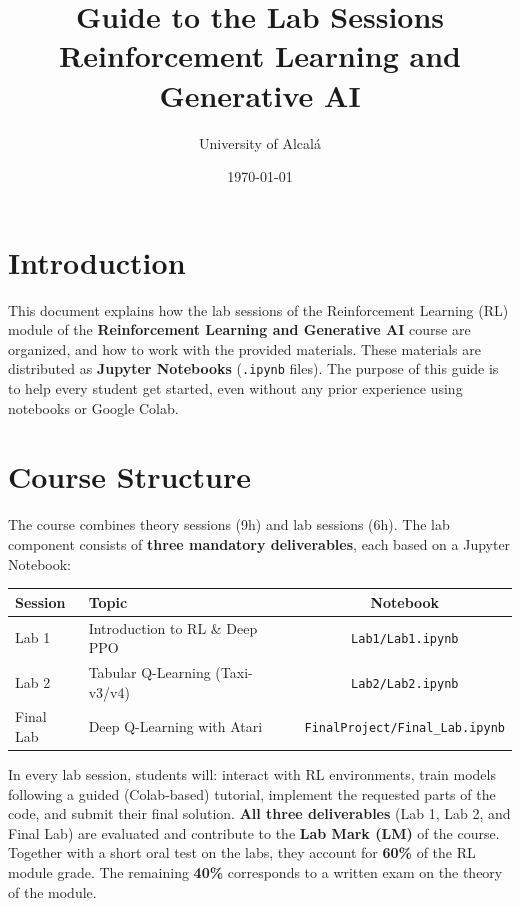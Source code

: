 \documentclass[11pt,a4paper]{article}
\title{\bfseries Guide to the Lab Sessions \\ \large Reinforcement Learning and Generative AI}
\author{University of Alcal\'a}
\date{\today}
\begin{document}
\maketitle
\thispagestyle{empty}

\tableofcontents
\newpage

\section{Introduction}
This document explains how the lab sessions of the Reinforcement Learning (RL) module of the \textbf{Reinforcement Learning and Generative AI} course are organized, and how to work with the provided materials. These materials are distributed as \textbf{Jupyter Notebooks} (\texttt{.ipynb} files). The purpose of this guide is to help every student get started, even without any prior experience using notebooks or Google Colab.

\section{Course Structure}

The course combines theory sessions (9h) and lab sessions (6h). The lab component consists of \textbf{three mandatory deliverables}, each based on a Jupyter Notebook:

\begin{table}[h!]
\centering
\begin{tabularx}{\textwidth}{l X c}
\toprule
\textbf{Session} & \textbf{Topic} & \textbf{Notebook} \\
\midrule
Lab 1 & Introduction to RL \& Deep PPO & \texttt{Lab1/Lab1.ipynb} \\
Lab 2 & Tabular Q-Learning (Taxi-v3/v4) & \texttt{Lab2/Lab2.ipynb} \\
Final Lab & Deep Q-Learning with Atari & \texttt{FinalProject/Final\_Lab.ipynb} \\
\bottomrule
\end{tabularx}
\end{table}

In every lab session, students will: interact with RL environments, train models following a guided (Colab-based) tutorial, implement the requested parts of the code, and submit their final solution. \textbf{All three deliverables} (Lab 1, Lab 2, and Final Lab) are evaluated and contribute to the \textbf{Lab Mark (LM)} of the course. Together with a short oral test on the labs, they account for \textbf{60\%} of the RL module grade. The remaining \textbf{40\%} corresponds to a written exam on the theory of the module.
\end{document}

